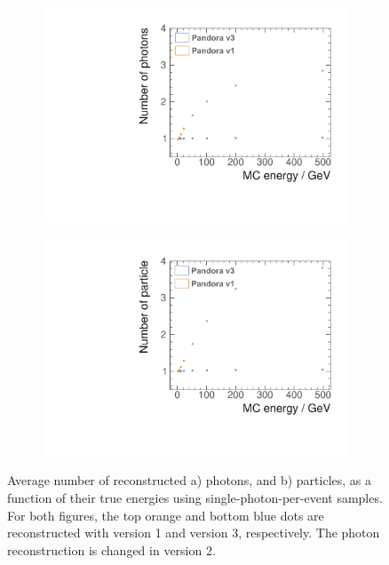 \begin{figure}[tbph]
\centering
    \begin{subfigure}[b]{0.45\textwidth}
        \includegraphics[width=\textwidth]{photon/SingleN_pedit.pdf}
        \caption{}
        \label{fig:photonSingleN_p}
    \end{subfigure}
    \begin{subfigure}[b]{0.45\textwidth}
        \includegraphics[width=\textwidth]{photon/SingleN_alledit.pdf}
        \caption{}
        \label{fig:photonSingleN_all}
    \end{subfigure}
\caption[Average number of reconstructed photons and reconstructed particles, as a function of their true energy using single photon sample.]
{Average number of reconstructed a) photons, and b) particles, as a function of their true energies using  single-photon-per-event samples. For both figures, the top orange and bottom blue dots are reconstructed with \pandora version 1 and version 3, respectively. The photon reconstruction is changed in \pandora version 2.}
\label{fig:photonSingleN}
\end{figure}



